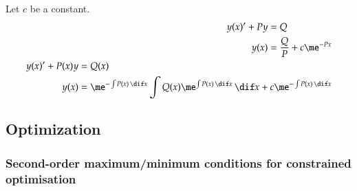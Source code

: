 \documentclass[a4paper]{article}
\numberwithin{equation}{subsection}
\begin{document}
Let $c$ be a constant.
\begin{align}
  \begin{split}
    y(x)' + P y &= Q
    \\
    y(x) &= \frac{Q}{P} + c \me^{-Px}
  \end{split}
  \\
  \begin{split}
    y(x)' + P(x) y &= Q(x)
    \\
    y(x) &= \me^{-\int P(x)\,\dif x}
    \int Q(x) \me^{\int P(x)\,\dif x} \,\dif x
    + c \me^{-\int P(x)\,\dif x}
  \end{split}
\end{align}



\clearpage
\subsection{Optimization}

\subsubsection[Second-order conditions]{Second-order maximum/minimum conditions for constrained
  optimisation}
\end{document}

